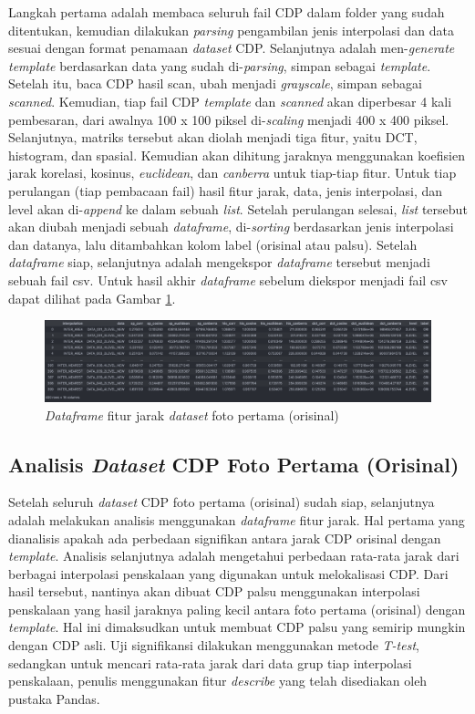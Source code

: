 Langkah pertama adalah membaca seluruh fail CDP dalam folder yang sudah ditentukan, kemudian dilakukan \emph{parsing} pengambilan jenis interpolasi dan data
sesuai dengan format penamaan \emph{dataset} CDP. Selanjutnya adalah men-\emph{generate} \emph{template} berdasarkan data yang sudah di-\emph{parsing}, simpan
sebagai \emph{template}. Setelah itu, baca CDP hasil scan, ubah menjadi \emph{grayscale}, simpan sebagai \emph{scanned}. Kemudian, tiap fail CDP
\emph{template} dan \emph{scanned} akan diperbesar 4 kali pembesaran, dari awalnya 100 x 100 piksel di-\emph{scaling} menjadi 400 x 400 piksel. Selanjutnya,
matriks tersebut akan diolah menjadi tiga fitur, yaitu DCT, histogram, dan spasial. Kemudian akan dihitung jaraknya menggunakan koefisien jarak korelasi,
kosinus, \emph{euclidean}, dan \emph{canberra} untuk tiap-tiap fitur. Untuk tiap perulangan (tiap pembacaan fail) hasil fitur jarak, data, jenis interpolasi,
dan level akan di-\emph{append} ke dalam sebuah \emph{list}. Setelah perulangan selesai, \emph{list} tersebut akan diubah menjadi sebuah
\emph{dataframe}, di-\emph{sorting} berdasarkan jenis interpolasi dan datanya, lalu ditambahkan kolom label (orisinal atau palsu). Setelah \emph{dataframe}
siap, selanjutnya adalah mengekspor \emph{dataframe} tersebut menjadi sebuah fail csv. Untuk hasil akhir \emph{dataframe} sebelum diekspor menjadi fail csv
dapat dilihat pada Gambar \ref{Fig: 3-dataframefitur}.

\begin{figure}[h]
	\centering
	\includegraphics[width=\textwidth]{contents/chapter-3/3-dataframefitur.png}
	\caption{\emph{Dataframe} fitur jarak \emph{dataset} foto pertama (orisinal)}
	\label{Fig: 3-dataframefitur}
\end{figure}

\subsection{Analisis \emph{Dataset} CDP Foto Pertama (Orisinal)} Setelah seluruh \emph{dataset} CDP foto pertama (orisinal) sudah siap, selanjutnya adalah melakukan analisis menggunakan
\emph{dataframe} fitur jarak. Hal pertama yang dianalisis apakah ada perbedaan signifikan antara jarak CDP orisinal dengan \emph{template}. Analisis selanjutnya adalah mengetahui perbedaan rata-rata jarak dari berbagai interpolasi penskalaan yang digunakan untuk melokalisasi CDP. Dari hasil
tersebut, nantinya akan dibuat CDP palsu menggunakan interpolasi penskalaan yang hasil jaraknya paling kecil antara foto pertama (orisinal) dengan
\emph{template}. Hal ini dimaksudkan untuk membuat CDP palsu yang semirip mungkin dengan CDP asli. Uji signifikansi dilakukan menggunakan metode \emph{T-test},
sedangkan untuk mencari rata-rata jarak dari data grup tiap interpolasi penskalaan, penulis menggunakan fitur \emph{describe} yang telah disediakan oleh
pustaka Pandas.


